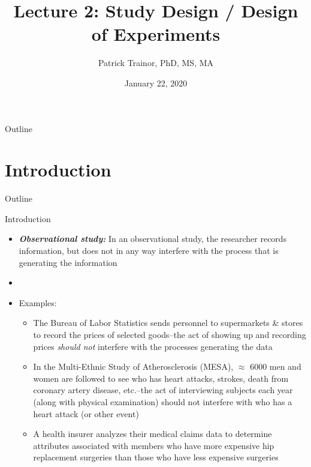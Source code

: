 \documentclass[xcolor=dvipsnames]{beamer}
\title[Lecture 2]{Lecture 2: Study Design / Design of Experiments}
\author[Patrick Trainor]{Patrick Trainor, PhD, MS, MA}
\institute[NMSU]{New Mexico State University}
\date{January 22, 2020}
\begin{document}
\begin{frame}
\maketitle
\end{frame}

\begin{frame}{Outline}
\tableofcontents[hideallsubsections]
\end{frame}

\section{Introduction}
\begin{frame}{Outline}
\tableofcontents[currentsection,subsectionstyle=show/shaded/hide]
\end{frame}

\begin{frame}{Introduction}
	\begin{itemize}
		\item \textbf{\emph{Observational study:}} In an observational study, the researcher records information, but does not in any way interfere with the process that is generating the information \pause
		\item[]
		\item Examples: \pause
		\begin{itemize}
			\item The Bureau of Labor Statistics sends personnel to supermarkets \& stores to record the prices of selected goods--the act of showing up and recording prices \emph{should not} interfere with the processes generating the data \pause
			\item In the Multi-Ethnic Study of Atherosclerosis (MESA), $\approx$ 6000 men and women are followed to see who has heart attacks, strokes, death from coronary artery disease, etc.--the act of interviewing subjects each year (along with physical examination) should not interfere with who has a heart attack (or other event) \pause
			\item A health insurer analyzes their medical claims data to determine attributes associated with members who have more expensive hip replacement surgeries than those who have less expensive surgeries
		\end{itemize}
	\end{itemize}
\end{frame}
\end{document}
